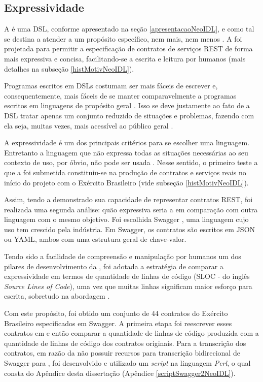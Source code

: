 \subsection{Expressividade}
\label{estudoExpressividadeNeoIDL}
\vspace{-6mm}

A \neoidl{} é uma DSL, conforme apresentado na seção \ref{apresentacaoNeoIDL},
e como tal se destina a atender a um propósito específico, nem mais, nem menos
\cite{hudak1998modular}. A \neoidl{} foi projetada para permitir a
especificação de contratos de serviços REST de forma mais expressiva e concisa,
facilitando-se a escrita e leitura por humanos (mais detalhes na subseção
\ref{histMotivNeoIDL}).

Programas escritos em DSLs costumam ser mais fáceis de escrever e,
consequentemente, mais fáceis de se manter comparavelmente a programas escritos
em linguagens de propósito geral \cite{hudak1998modular}. Isso se deve
justamente ao fato de a DSL tratar apenas um conjunto reduzido de situações e
problemas, fazendo com ela seja, muitas vezes, mais acessível ao público geral
\cite{taha2008domain}.

A expressividade é um dos principais critérios para se escolher uma
linguagem. Entretanto a linguagem que não expressa todas as situações
necessárias ao seu contexto de uso, por óbvio, não pode ser usada
\cite{mackinlay1985expressiveness}. Nesse sentido, o primeiro teste a que a
\neoidl{} foi submetida constituiu-se na produção de contratos e serviços reais
no início do projeto com o Exército Brasileiro (vide subseção \ref{histMotivNeoIDL}).

Assim, tendo a \neoidl{} demonstrado sua capacidade de representar contratos
REST, foi realizada uma segunda análise: quão expressiva seria a \neoidl{}
em comparação com outra linguagem com o mesmo objetivo. Foi escolhida
Swagger \cite{swaggerSite}, uma linguagem cujo uso tem crescido pela indústria.
Em Swagger, os contratos são escritos em JSON\cite{JSon} ou YAML\cite{YAML},
ambos com uma estrutura geral de chave-valor.

Tendo sido a facilidade de compreensão e manipulação por humanos um dos pilares
de desenvolvimento da \neoidl{}, foi adotada a estratégia de comparar a
expressividade em termos de quantidade de linhas de código (SLOC - do inglês
\textit{Source Lines of Code}), uma vez que muitas linhas significam maior
esforço para escrita, sobretudo na abordagem \CtFirst{}.

Com este propósito, foi obtido um conjunto de 44 contratos do Exército
Brasileiro especificados em Swagger. A primeira etapa foi reescrever esses
contratos em \neoidl{} e então comparar a quantidade de linhas de código
produzida com a quantidade de linhas de código dos contratos originais. Para a
transcrição dos contratos, em razão da \neoidl{} não possuir recursos para
transcrição bidirecional de Swagger para \neoidl{}, foi desenvolvido
e utilizado um \textit{script} na linguagem \textit{Perl}, 
o qual consta do Apêndice desta dissertação
(Apêndice \ref{scriptSwagger2NeoIDL}).

